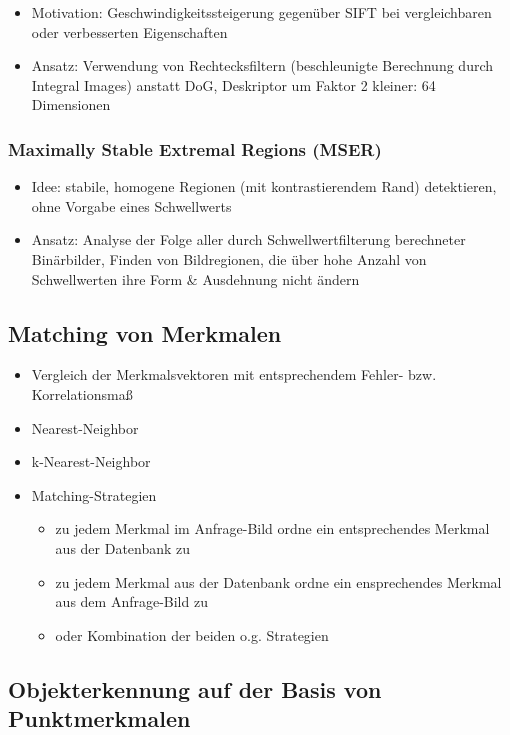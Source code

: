 \documentclass[paper=a4, fontsize=11pt]{scrartcl} %
\numberwithin{equation}{section} %
\numberwithin{figure}{section} %
\numberwithin{table}{section} %
\begin{document}
\begin{itemize}
\item Motivation: Geschwindigkeitssteigerung gegenüber SIFT bei vergleichbaren oder verbesserten Eigenschaften
\item Ansatz: Verwendung von Rechtecksfiltern (beschleunigte Berechnung durch Integral Images) anstatt DoG, Deskriptor um Faktor 2 kleiner: 64 Dimensionen
\end{itemize}

\subsubsection{Maximally Stable Extremal Regions (MSER)}

\begin{itemize}
\item Idee: stabile, homogene Regionen (mit kontrastierendem Rand) detektieren, ohne Vorgabe eines Schwellwerts
\item Ansatz: Analyse der Folge aller durch Schwellwertfilterung berechneter Binärbilder, Finden von Bildregionen, die über hohe Anzahl von Schwellwerten ihre Form \& Ausdehnung nicht ändern
\end{itemize}

\subsection{Matching von Merkmalen}

\begin{itemize}
\item Vergleich der Merkmalsvektoren mit entsprechendem Fehler- bzw. Korrelationsmaß
\item Nearest-Neighbor
\item k-Nearest-Neighbor
\item Matching-Strategien
\begin{itemize}
\item zu jedem Merkmal im Anfrage-Bild ordne ein entsprechendes Merkmal aus der Datenbank zu
\item zu jedem Merkmal aus der Datenbank ordne ein ensprechendes Merkmal aus dem Anfrage-Bild zu
\item oder Kombination der beiden o.g. Strategien
\end{itemize}
\end{itemize}

\subsection{Objekterkennung auf der Basis von Punktmerkmalen}
\end{document}
